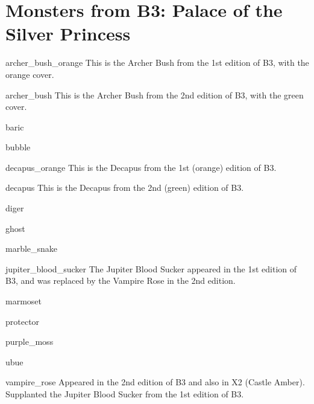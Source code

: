 \documentclass[a4paper,serif]{module}
\begin{document}
\part{Monsters from B3: Palace of the Silver Princess}

\begin{newmonster}{archer_bush_orange}
This is the Archer Bush from the 1st edition of B3, with the orange cover.
\end{newmonster}
\begin{newmonster}{archer_bush}
This is the Archer Bush from the 2nd edition of B3, with the green cover.
\end{newmonster}
\begin{newmonster}{baric}\end{newmonster}
\begin{newmonster}{bubble}\end{newmonster}
\begin{newmonster}{decapus_orange}
This is the Decapus from the 1st (orange) edition of B3.
\end{newmonster}
\begin{newmonster}{decapus}
This is the Decapus from the 2nd (green) edition of B3.
\end{newmonster}
\begin{newmonster}{diger}\end{newmonster}
\begin{newmonster}{ghost}\end{newmonster}
\begin{newmonster}{marble_snake}\end{newmonster}
\begin{newmonster}{jupiter_blood_sucker}
The Jupiter Blood Sucker appeared in the 1st edition of B3, and was replaced by the Vampire Rose in the 2nd edition.
\end{newmonster}
\begin{newmonster}{marmoset}\end{newmonster}
\begin{newmonster}{protector}\end{newmonster}
\begin{newmonster}{purple_moss}\end{newmonster}
\begin{newmonster}{ubue}\end{newmonster}
\begin{newmonster}{vampire_rose}
Appeared in the 2nd edition of B3 and also in X2 (Castle Amber). Supplanted the Jupiter Blood Sucker from the 1st edition of B3.
\end{newmonster}
\end{document}
